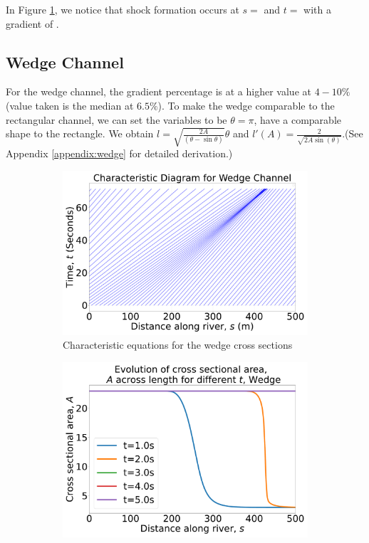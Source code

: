 \documentclass[12pt]{article}
\begin{document}
In Figure \ref{fig:wedge_char}, we notice that shock formation occurs at $s= $ and $t= $ with a gradient of .

\subsection{Wedge Channel}
For the wedge channel, the gradient percentage is at a higher value at $4-10\%$ (value taken is the median at $6.5\%$). To make the wedge comparable to the rectangular channel, we can set the variables to be $\theta = \pi$, have a comparable shape to the rectangle. We obtain $l =\sqrt{\frac{2A}{\left(\theta - \sin\theta\right)}}\theta$ and $l'(A) =\frac{2}{\sqrt{2A\sin(\theta)}}$.(See Appendix \ref{appendix:wedge} for detailed derivation.)

\begin{figure}[ht]
    \centering
    \begin{subfigure}[b]{0.49\textwidth}
        \centering
        \includegraphics[width=\textwidth]{Figures/Wedge_characteristic.pdf}
        \caption{Characteristic equations for the wedge cross sections}
        \label{fig:wedge_char}
    \end{subfigure}
    \hfill
    \begin{subfigure}[b]{0.49\textwidth}
        \centering
        \includegraphics[width=\textwidth]{Figures/Wedge_godunov.pdf}

\end{subfigure}
\end{figure}
\end{document}
